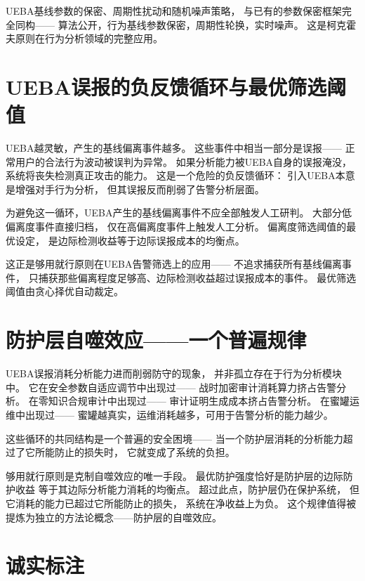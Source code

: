 \documentclass[11pt,a4paper]{article}
\begin{document}
UEBA基线参数的保密、周期性扰动和随机噪声策略，
与已有的参数保密框架完全同构——
算法公开，行为基线参数保密，周期性轮换，实时噪声。
这是柯克霍夫原则在行为分析领域的完整应用。

\section{UEBA误报的负反馈循环与最优筛选阈值}

UEBA越灵敏，产生的基线偏离事件越多。
这些事件中相当一部分是误报——
正常用户的合法行为波动被误判为异常。
如果分析能力被UEBA自身的误报淹没，
系统将丧失检测真正攻击的能力。
这是一个危险的负反馈循环：
引入UEBA本意是增强对手行为分析，
但其误报反而削弱了告警分析层面。

为避免这一循环，UEBA产生的基线偏离事件不应全部触发人工研判。
大部分低偏离度事件直接归档，
仅在高偏离度事件上触发人工分析。
偏离度筛选阈值的最优设定，
是边际检测收益等于边际误报成本的均衡点。

这正是够用就行原则在UEBA告警筛选上的应用——
不追求捕获所有基线偏离事件，
只捕获那些偏离程度足够高、边际检测收益超过误报成本的事件。
最优筛选阈值由贪心择优自动裁定。

\section{防护层自噬效应——一个普遍规律}

UEBA误报消耗分析能力进而削弱防守的现象，
并非孤立存在于行为分析模块中。
它在安全参数自适应调节中出现过——
战时加密审计消耗算力挤占告警分析。
在零知识合规审计中出现过——
审计证明生成成本挤占告警分析。
在蜜罐运维中出现过——
蜜罐越真实，运维消耗越多，可用于告警分析的能力越少。

这些循环的共同结构是一个普遍的安全困境——
当一个防护层消耗的分析能力超过了它所能防止的损失时，
它就变成了系统的负担。

够用就行原则是克制自噬效应的唯一手段。
最优防护强度恰好是防护层的边际防护收益
等于其边际分析能力消耗的均衡点。
超过此点，防护层仍在保护系统，
但它消耗的能力已超过它所能防止的损失，
系统在净收益上为负。
这个规律值得被提炼为独立的方法论概念——防护层的自噬效应。

\section{诚实标注}
\end{document}
